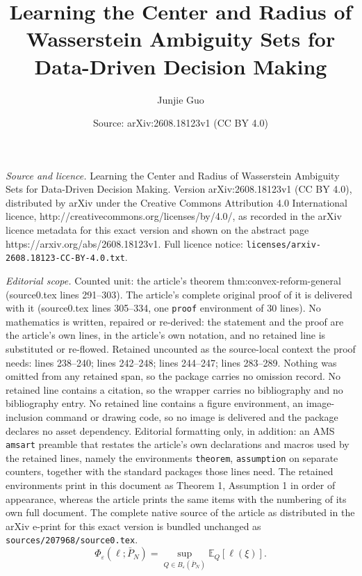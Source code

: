 \documentclass[10pt,a4paper]{amsart}
\title{Learning the Center and Radius of Wasserstein Ambiguity Sets for Data-Driven Decision Making}
\author{Junjie Guo}
\date{Source: arXiv:2608.18123v1 (CC BY 4.0)}
\newcommand{\E}{\mathbb{E}}
\newcommand{\Pbar}{\bar P_N}
\begin{document}
\maketitle

\noindent\emph{Source and licence.} Learning the Center and Radius of Wasserstein Ambiguity Sets for Data-Driven Decision Making. Version arXiv:2608.18123v1 (CC BY 4.0), distributed by arXiv under the Creative Commons Attribution 4.0 International licence, http://creativecommons.org/licenses/by/4.0/, as recorded in the arXiv licence metadata for this exact version and shown on the abstract page https://arxiv.org/abs/2608.18123v1. Full licence notice: \texttt{licenses/arxiv-2608.18123-CC-BY-4.0.txt}.\par\smallskip

\noindent\textit{Editorial scope.} Counted unit: the article's theorem thm:convex-reform-general (source0.tex lines 291--303). The article's complete original proof of it is delivered with it (source0.tex lines 305--334, one \texttt{proof} environment of 30 lines). No mathematics is written, repaired or re-derived: the statement and the proof are the article's own lines, in the article's own notation, and no retained line is substituted or re-flowed.  Retained uncounted as the source-local context the proof needs: lines 238--240; lines 242--248; lines 244--247; lines 283--289.  Nothing was omitted from any retained span, so the package carries no omission record.  No retained line contains a citation, so the wrapper carries no bibliography and no bibliography entry.  No retained line contains a figure environment, an image-inclusion command or drawing code, so no image is delivered and the package declares no asset dependency.  Editorial formatting only, in addition: an AMS \texttt{amsart} preamble that restates the article's own declarations and macros used by the retained lines, namely the environments \texttt{theorem}, \texttt{assumption} on separate counters, together with the standard packages those lines need.  The retained environments print in this document as Theorem 1, Assumption 1 in order of appearance, whereas the article prints the same items with the numbering of its own full document.  The complete native source of the article as distributed in the arXiv e-print for this exact version is bundled unchanged as \texttt{sources/207968/source0.tex}.
\begin{equation}\label{eq:wce-general}
    \Phi_{\varepsilon}(\ell;\Pbar)=\sup_{Q\in B_\varepsilon(\Pbar)}\E_Q[\ell(\xi)].
\end{equation}
\end{document}
